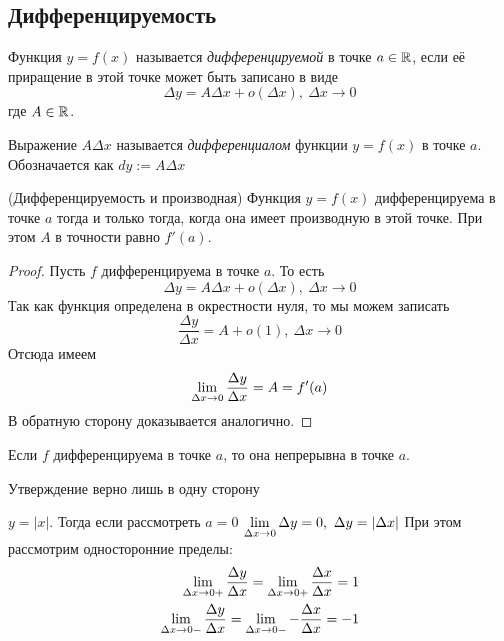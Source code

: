 \subsection{Дифференцируемость}

\begin{definition}
	Функция $y = f(x)$ называется \textit{дифференцируемой} в точке $a \in \mathbb{R}$, если её приращение в этой точке может быть записано в виде
	$$
		\Delta y = A\Delta x + o(\Delta x),\ \Delta x \to 0
	$$
	где $A \in \mathbb{R}$.
	
	Выражение $A\Delta x$ называется \textit{дифференциалом} функции $y = f(x)$ в точке $a$. Обозначается как $dy := A \Delta x$
\end{definition}

\begin{theorem}
	(Дифференцируемость и производная) Функция $y = f(x)$ дифференцируема в точке $a$ тогда и только тогда, когда она имеет производную в этой точке. При этом $A$ в точности равно $f'(a)$.
\end{theorem}

\begin{proof}
	Пусть $f$ дифференцируема в точке $a$. То есть
	$$
		\Delta y = A \Delta x + o(\Delta x),\ \Delta x \to 0
	$$
	Так как функция определена в окрестности нуля, то мы можем записать
	$$
		\frac{\Delta y}{\Delta x} = A + o(1),\ \Delta x \to 0
	$$
	Отсюда имеем
	$$
		\lim\limits_{\Delta x \to 0} \frac{\Delta y}{\Delta x} = A = f'(a)
	$$
	В обратную сторону доказывается аналогично.
\end{proof}

\begin{corollary}
	Если $f$ дифференцируема в точке $a$, то она непрерывна в точке $a$.
\end{corollary}

\begin{note}
	Утверждение верно лишь в одну сторону
\end{note}

\begin{example}
	$y = |x|$. Тогда если рассмотреть $a = 0$
	$\lim\limits_{\Delta x \to 0} \Delta y = 0,\ \Delta y = |\Delta x|$
	При этом рассмотрим односторонние пределы:
	\begin{align*}
		\lim\limits_{\Delta x \to 0+} \frac{\Delta y}{\Delta x} = \lim\limits_{\Delta x \to 0+} \frac{\Delta x}{\Delta x} = 1
		\\
		\lim\limits_{\Delta x \to 0-} \frac{\Delta y}{\Delta x} = \lim\limits_{\Delta x \to 0-} -\frac{\Delta x}{\Delta x} = -1
	\end{align*}
\end{example}

